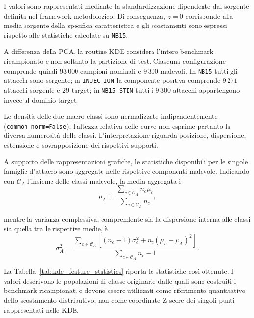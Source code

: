 I valori sono rappresentati mediante la standardizzazione dipendente dal sorgente definita nel framework metodologico. 
Di conseguenza, $z=0$ corrisponde alla media sorgente della specifica caratteristica e gli scostamenti sono espressi rispetto alle statistiche calcolate su \texttt{NB15}.

A differenza della PCA, la routine KDE considera l'intero benchmark ricampionato e non soltanto la partizione di test. 
Ciascuna configurazione comprende quindi $93\,000$ campioni nominali e $9\,300$ malevoli. 
In \texttt{NB15} tutti gli attacchi sono sorgente; in \texttt{INJECTION} la componente positiva comprende $9\,271$ attacchi sorgente e $29$ target; in \texttt{NB15\_STIN} tutti i $9\,300$ attacchi appartengono invece al dominio target.

Le densità delle due macro-classi sono normalizzate indipendentemente (\texttt{common\_norm=False}); l'altezza relativa delle curve non esprime pertanto la diversa numerosità delle classi. 
L'interpretazione riguarda posizione, dispersione, estensione e sovrapposizione dei rispettivi supporti.

A supporto delle rappresentazioni grafiche, le statistiche disponibili per le singole famiglie d'attacco sono aggregate nelle rispettive componenti malevole. 
Indicando con $\mathcal{C}_{A}$ l'insieme delle classi malevole, la media aggregata è
\begin{equation}
    \mu_{A}
    =
    \frac{
        \displaystyle\sum_{c\in\mathcal{C}_{A}} n_{c}\mu_{c}
    }{
        \displaystyle\sum_{c\in\mathcal{C}_{A}} n_{c}
    },
\end{equation}

mentre la varianza complessiva, comprendente sia la dispersione interna alle classi sia quella tra le rispettive medie, è
\begin{equation}
    \sigma_{A}^{2}
    =
    \frac{
        \displaystyle
        \sum_{c\in\mathcal{C}_{A}}
        \left[
            (n_{c}-1)\sigma_{c}^{2}
            +
            n_{c}(\mu_{c}-\mu_{A})^{2}
        \right]
    }{
        \displaystyle
        \sum_{c\in\mathcal{C}_{A}} n_{c}-1
    }.
\end{equation}

La Tabella~\ref{tab:kde_feature_statistics} riporta le statistiche così ottenute. 
I valori descrivono le popolazioni di classe originarie dalle quali sono costruiti i benchmark ricampionati e devono essere utilizzati come riferimento quantitativo dello scostamento distributivo, non come coordinate Z-score dei singoli punti rappresentati nelle KDE.


